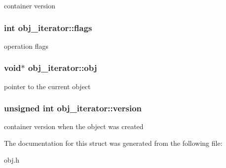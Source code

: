 container version \hypertarget{structobj__iterator_a09adf4a77131fe2d9a4a295cd694500a}{
\subsubsection[{flags}]{\setlength{\rightskip}{0pt plus 5cm}int {\bf obj\_\-iterator::flags}}}
\label{structobj__iterator_a09adf4a77131fe2d9a4a295cd694500a}
operation flags \hypertarget{structobj__iterator_aa50a51c930aa20abd91194f03f0265b3}{
\subsubsection[{obj}]{\setlength{\rightskip}{0pt plus 5cm}void$\ast$ {\bf obj\_\-iterator::obj}}}
\label{structobj__iterator_aa50a51c930aa20abd91194f03f0265b3}
pointer to the current object \hypertarget{structobj__iterator_a1051579d4ab6b9e35195160229ef9fd6}{
\subsubsection[{version}]{\setlength{\rightskip}{0pt plus 5cm}unsigned int {\bf obj\_\-iterator::version}}}
\label{structobj__iterator_a1051579d4ab6b9e35195160229ef9fd6}
container version when the object was created 

The documentation for this struct was generated from the following file:\begin{DoxyCompactItemize}
\item 
obj.h\end{DoxyCompactItemize}

